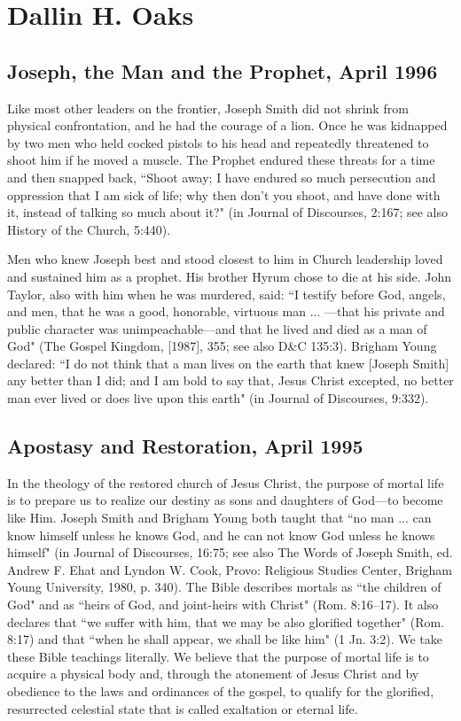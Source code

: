 \section{Dallin H. Oaks}

\subsection{Joseph, the Man and the Prophet, April 1996}

Like most other leaders on the frontier, Joseph Smith did not shrink from physical confrontation, and he had the courage of a lion. Once he was kidnapped by two men who held cocked pistols to his head and repeatedly threatened to shoot him if he moved a muscle. The Prophet endured these threats for a time and then snapped back, ``Shoot away; I have endured so much persecution and oppression that I am sick of life; why then don't you shoot, and have done with it, instead of talking so much about it?" (in Journal of Discourses, 2:167; see also History of the Church, 5:440).

Men who knew Joseph best and stood closest to him in Church leadership loved and sustained him as a prophet. His brother Hyrum chose to die at his side. John Taylor, also with him when he was murdered, said: ``I testify before God, angels, and men, that he was a good, honorable, virtuous man ... —that his private and public character was unimpeachable—and that he lived and died as a man of God" (The Gospel Kingdom, [1987], 355; see also D\&C 135:3). Brigham Young declared: ``I do not think that a man lives on the earth that knew [Joseph Smith] any better than I did; and I am bold to say that, Jesus Christ excepted, no better man ever lived or does live upon this earth" (in Journal of Discourses, 9:332).

\subsection{Apostasy and Restoration, April 1995}

In the theology of the restored church of Jesus Christ, the purpose of mortal life is to prepare us to realize our destiny as sons and daughters of God—to become like Him. Joseph Smith and Brigham Young both taught that ``no man ... can know himself unless he knows God, and he can not know God unless he knows himself" (in Journal of Discourses, 16:75; see also The Words of Joseph Smith, ed. Andrew F. Ehat and Lyndon W. Cook, Provo: Religious Studies Center, Brigham Young University, 1980, p. 340). The Bible describes mortals as ``the children of God" and as ``heirs of God, and joint-heirs with Christ" (Rom. 8:16–17). It also declares that ``we suffer with him, that we may be also glorified together" (Rom. 8:17) and that ``when he shall appear, we shall be like him" (1 Jn. 3:2). We take these Bible teachings literally. We believe that the purpose of mortal life is to acquire a physical body and, through the atonement of Jesus Christ and by obedience to the laws and ordinances of the gospel, to qualify for the glorified, resurrected celestial state that is called exaltation or eternal life.